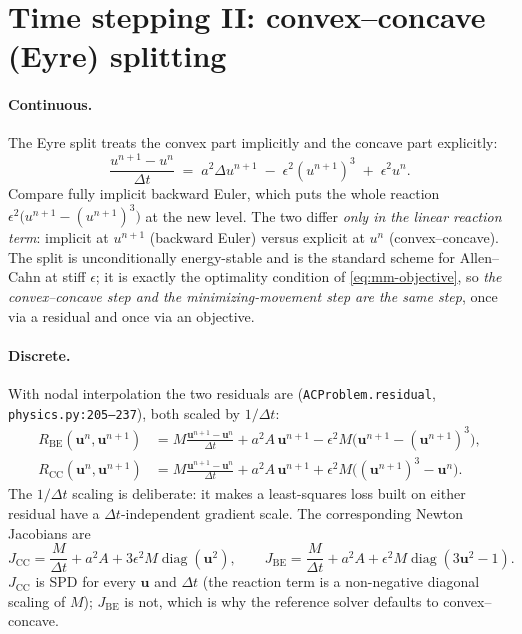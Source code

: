 \documentclass[11pt]{article}
\newcommand{\dt}{\Delta t}
\begin{document}
\section{Time stepping II: convex--concave (Eyre) splitting}
\label{sec:cc}

\paragraph{Continuous.}
The Eyre split treats the convex part implicitly and the concave part explicitly:
\begin{equation}\label{eq:cc-continuous}
   \frac{u^{n+1}-u^n}{\dt}
   \;=\; a^2\Delta u^{n+1} \;-\; \epsilon^2 (u^{n+1})^3 \;+\; \epsilon^2 u^n .
\end{equation}
Compare fully implicit backward Euler, which puts the whole reaction
$\epsilon^2\big(u^{n+1}-(u^{n+1})^3\big)$ at the new level. The two differ \emph{only in the
linear reaction term}: implicit at $u^{n+1}$ (backward Euler) versus explicit at $u^n$
(convex--concave). The split is unconditionally energy-stable and is the standard scheme for
Allen--Cahn at stiff $\epsilon$; it is exactly the optimality condition of \eqref{eq:mm-objective},
so \emph{the convex--concave step and the minimizing-movement step are the same step}, once via a
residual and once via an objective.

\paragraph{Discrete.}
With nodal interpolation the two residuals are (\texttt{ACProblem.residual},
\texttt{physics.py:205--237}), both scaled by $1/\dt$:
\begin{align}
   R_{\mathrm{BE}}(\mathbf u^n,\mathbf u^{n+1})
   &= M\frac{\mathbf u^{n+1}-\mathbf u^{n}}{\dt} + a^2A\,\mathbf u^{n+1}
      - \epsilon^2 M\big(\mathbf u^{n+1}-(\mathbf u^{n+1})^3\big), \label{eq:res-be}\\[2pt]
   R_{\mathrm{CC}}(\mathbf u^n,\mathbf u^{n+1})
   &= M\frac{\mathbf u^{n+1}-\mathbf u^{n}}{\dt} + a^2A\,\mathbf u^{n+1}
      + \epsilon^2 M\big((\mathbf u^{n+1})^3-\mathbf u^{n}\big). \label{eq:res-cc}
\end{align}
The $1/\dt$ scaling is deliberate: it makes a least-squares loss built on either residual have a
$\dt$-independent gradient scale. The corresponding Newton Jacobians are
\begin{equation}\label{eq:jacobians}
   J_{\mathrm{CC}} = \frac{M}{\dt} + a^2A + 3\epsilon^2 M\operatorname{diag}(\mathbf u^2),
   \qquad
   J_{\mathrm{BE}} = \frac{M}{\dt} + a^2A + \epsilon^2 M\operatorname{diag}(3\mathbf u^2-1).
\end{equation}
$J_{\mathrm{CC}}$ is SPD for every $\mathbf u$ and $\dt$ (the reaction term is a non-negative
diagonal scaling of $M$); $J_{\mathrm{BE}}$ is not, which is why the reference solver defaults to
convex--concave.
\end{document}
